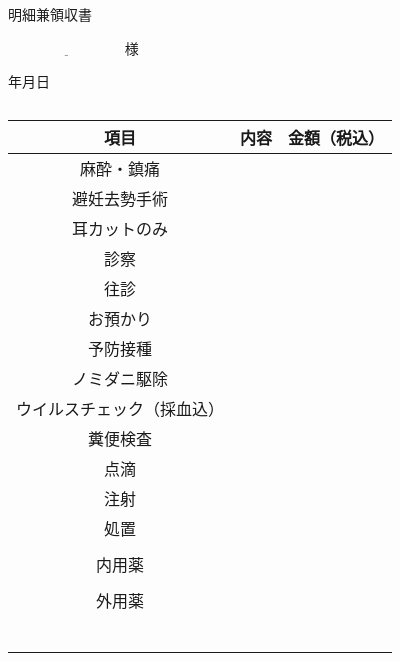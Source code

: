 \documentclass[b5paper, twocolumn, landscape]{jsarticle}
\begin{document}
\setlength{\columnseprule}{0.4pt}




\begin{center}
\Large
明細兼領収書
\end{center}

\large
$\underline{\hspace{100pt}}$様

\begin{flushright}
\normalsize
\vspace{-23pt}
年\hspace{20pt}月\hspace{20pt}日
\end{flushright}
\vspace{-40pt}
\begin{table}[htbp]
	\captionsetup{labelformat=empty,labelsep=none}
	\caption{}
	\label{}
	\begin{center}
	\small
	\begin{tabular}{c|c|c}  \toprule
	項目 & 内容 & 金額（税込）  \\ \hline
	麻酔・鎮痛 & \hspace{100pt} & \\[2pt]
	避妊去勢手術 &  & \\[2pt]
	耳カットのみ &  & \\[2pt]
	診察 &  & \\[2pt]
	往診 &  & \\[2pt]
	お預かり &  & \\[2pt]
	予防接種 &  & \\[2pt]
	ノミダニ駆除 &  & \\[2pt]
	ウイルスチェック（採血込） &  & \\[2pt]
	糞便検査 &  & \\[2pt]
	点滴 &  & \\[2pt]
	注射 &  & \\[2pt]
	処置 &  & \\
	 &  & \\
	内用薬 &  & \\
	 &  & \\
	外用薬 &  & \\
	 &  & \\
	 &  & \\
	 &  & \\
	 &  & \\
	 &  & \\
	 &  & \\  \bottomrule
	 \end{tabular}
	 \end{center}
\end{table}
\small
\end{document}
